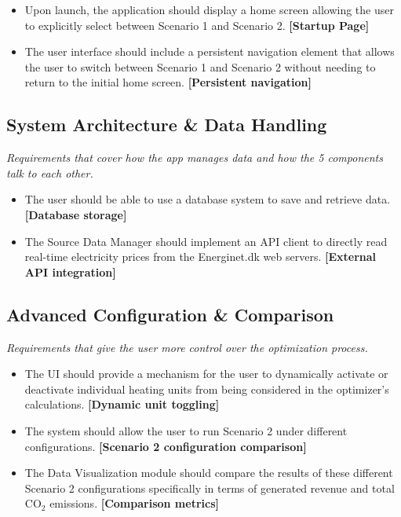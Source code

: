 \begin{itemize}
    \item Upon launch, the application should display a home screen allowing the user to explicitly select between Scenario 1 and Scenario 2. \textbf{[Startup Page]}
    \item The user interface should include a persistent navigation element that allows the user to switch between Scenario 1 and Scenario 2 without needing to return to the initial home screen. \textbf{[Persistent navigation]}
\end{itemize}

\subsection*{System Architecture \& Data Handling}
\textit{Requirements that cover how the app manages data and how the 5 components talk to each other.}

\begin{itemize}
    \item The user should be able to use a database system to save and retrieve data. \textbf{[Database storage]}
    \item The Source Data Manager should implement an API client to directly read real-time electricity prices from the Energinet.dk web servers. \textbf{[External API integration]}
\end{itemize}

\subsection*{Advanced Configuration \& Comparison}
\textit{Requirements that give the user more control over the optimization process.}

\begin{itemize}
    \item The UI should provide a mechanism for the user to dynamically activate or deactivate individual heating units from being considered in the optimizer's calculations. \textbf{[Dynamic unit toggling]}
    \item The system should allow the user to run Scenario 2 under different configurations. \textbf{[Scenario 2 configuration comparison]}
    \item The Data Visualization module should compare the results of these different Scenario 2 configurations specifically in terms of generated revenue and total $\text{CO}_2$ emissions. \textbf{[Comparison metrics]}
\end{itemize}

